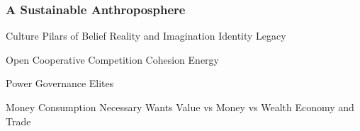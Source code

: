\documentclass[12pt, letterpaper]{article}
\begin{document}
\subsubsection{A Sustainable Anthroposphere}
\begin{outline}[enumerate]
\1 Culture
\2 Pilars of Belief
\3 Reality and Imagination
\3 Identity Legacy

\2 Open Cooperative Competition
\3 Cohesion
\3 Energy
\3


\1 Power
\2 Governance
\2 Elites

\1 Money
\2 Consumption
\3 Necessary
\3 Wants
\2 Value vs Money vs Wealth
\2 Economy and Trade



\end{outline}







\clearpage 
\renewcommand{\thepage}{}
\printbibliography
\end{document}
